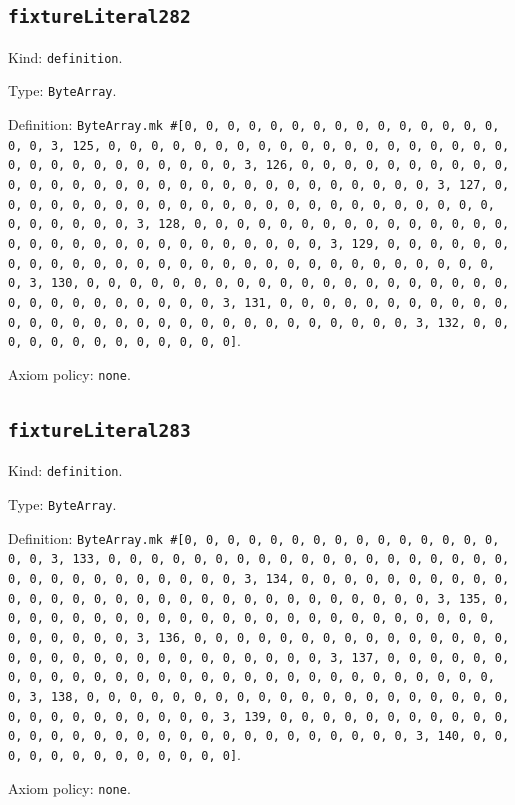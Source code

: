 \documentclass[11pt]{article}
\begin{document}
\subsection*{\texttt{fixtureLiteral282}}
\noindent Kind: \texttt{definition}.\par
\noindent Type: \texttt{ByteArray}.\par
\noindent Definition: \texttt{ByteArray.mk \#[0, 0, 0, 0, 0, 0, 0, 0, 0, 0, 0, 0, 0, 0, 0, 0, 0, 3, 125, 0, 0, 0, 0, 0, 0, 0, 0, 0, 0, 0, 0, 0, 0, 0, 0, 0, 0, 0, 0, 0, 0, 0, 0, 0, 0, 0, 0, 0, 0, 3, 126, 0, 0, 0, 0, 0, 0, 0, 0, 0, 0, 0, 0, 0, 0, 0, 0, 0, 0, 0, 0, 0, 0, 0, 0, 0, 0, 0, 0, 0, 0, 3, 127, 0, 0, 0, 0, 0, 0, 0, 0, 0, 0, 0, 0, 0, 0, 0, 0, 0, 0, 0, 0, 0, 0, 0, 0, 0, 0, 0, 0, 0, 0, 3, 128, 0, 0, 0, 0, 0, 0, 0, 0, 0, 0, 0, 0, 0, 0, 0, 0, 0, 0, 0, 0, 0, 0, 0, 0, 0, 0, 0, 0, 0, 0, 3, 129, 0, 0, 0, 0, 0, 0, 0, 0, 0, 0, 0, 0, 0, 0, 0, 0, 0, 0, 0, 0, 0, 0, 0, 0, 0, 0, 0, 0, 0, 0, 3, 130, 0, 0, 0, 0, 0, 0, 0, 0, 0, 0, 0, 0, 0, 0, 0, 0, 0, 0, 0, 0, 0, 0, 0, 0, 0, 0, 0, 0, 0, 0, 3, 131, 0, 0, 0, 0, 0, 0, 0, 0, 0, 0, 0, 0, 0, 0, 0, 0, 0, 0, 0, 0, 0, 0, 0, 0, 0, 0, 0, 0, 0, 0, 3, 132, 0, 0, 0, 0, 0, 0, 0, 0, 0, 0, 0, 0, 0]}.\par
\noindent Axiom policy: \texttt{none}.\par
\subsection*{\texttt{fixtureLiteral283}}
\noindent Kind: \texttt{definition}.\par
\noindent Type: \texttt{ByteArray}.\par
\noindent Definition: \texttt{ByteArray.mk \#[0, 0, 0, 0, 0, 0, 0, 0, 0, 0, 0, 0, 0, 0, 0, 0, 0, 3, 133, 0, 0, 0, 0, 0, 0, 0, 0, 0, 0, 0, 0, 0, 0, 0, 0, 0, 0, 0, 0, 0, 0, 0, 0, 0, 0, 0, 0, 0, 0, 3, 134, 0, 0, 0, 0, 0, 0, 0, 0, 0, 0, 0, 0, 0, 0, 0, 0, 0, 0, 0, 0, 0, 0, 0, 0, 0, 0, 0, 0, 0, 0, 3, 135, 0, 0, 0, 0, 0, 0, 0, 0, 0, 0, 0, 0, 0, 0, 0, 0, 0, 0, 0, 0, 0, 0, 0, 0, 0, 0, 0, 0, 0, 0, 3, 136, 0, 0, 0, 0, 0, 0, 0, 0, 0, 0, 0, 0, 0, 0, 0, 0, 0, 0, 0, 0, 0, 0, 0, 0, 0, 0, 0, 0, 0, 0, 3, 137, 0, 0, 0, 0, 0, 0, 0, 0, 0, 0, 0, 0, 0, 0, 0, 0, 0, 0, 0, 0, 0, 0, 0, 0, 0, 0, 0, 0, 0, 0, 3, 138, 0, 0, 0, 0, 0, 0, 0, 0, 0, 0, 0, 0, 0, 0, 0, 0, 0, 0, 0, 0, 0, 0, 0, 0, 0, 0, 0, 0, 0, 0, 3, 139, 0, 0, 0, 0, 0, 0, 0, 0, 0, 0, 0, 0, 0, 0, 0, 0, 0, 0, 0, 0, 0, 0, 0, 0, 0, 0, 0, 0, 0, 0, 3, 140, 0, 0, 0, 0, 0, 0, 0, 0, 0, 0, 0, 0, 0]}.\par
\noindent Axiom policy: \texttt{none}.\par
\end{document}
